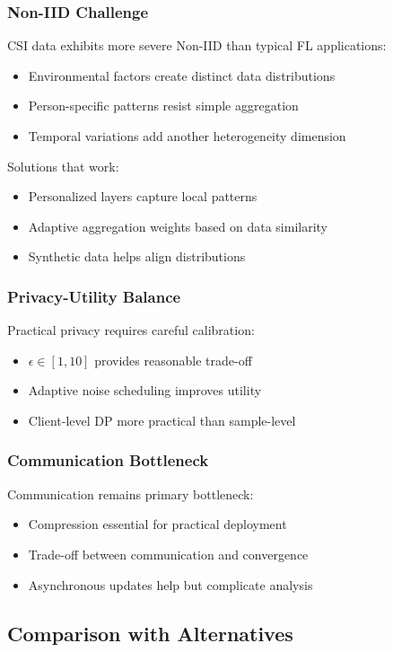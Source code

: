 \documentclass[journal]{IEEEtran}
\begin{document}
\subsubsection{Non-IID Challenge}
CSI data exhibits more severe Non-IID than typical FL applications:
\begin{itemize}
\item Environmental factors create distinct data distributions
\item Person-specific patterns resist simple aggregation
\item Temporal variations add another heterogeneity dimension
\end{itemize}

Solutions that work:
\begin{itemize}
\item Personalized layers capture local patterns
\item Adaptive aggregation weights based on data similarity
\item Synthetic data helps align distributions
\end{itemize}

\subsubsection{Privacy-Utility Balance}
Practical privacy requires careful calibration:
\begin{itemize}
\item $\epsilon \in [1, 10]$ provides reasonable trade-off
\item Adaptive noise scheduling improves utility
\item Client-level DP more practical than sample-level
\end{itemize}

\subsubsection{Communication Bottleneck}
Communication remains primary bottleneck:
\begin{itemize}
\item Compression essential for practical deployment
\item Trade-off between communication and convergence
\item Asynchronous updates help but complicate analysis
\end{itemize}

\subsection{Comparison with Alternatives}
\end{document}
